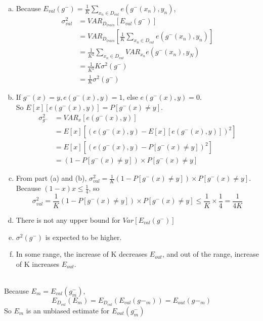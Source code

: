 \documentclass[11pt]{article}
\begin{document}
\newpage

\begin{enumerate} [(a)]
	\item Because $E_{val}(g^{-})=\frac{1}{K}\sum_{x_n\in D_{val}}e(g^{-}(x_n),y_n)$,
	\[
	\begin{aligned}
		\sigma^2_{val} &= VAR_{D_{train}}[E_{val}(g^{-})]\\
		&= VAR_{D_{train}}[\frac{1}{K}\sum_{x_n\in D_{val}}e(g^{-}(x_n),y_n)]\\
		&= \frac{1}{K^2}\sum_{x_n \in D_{val}}VAR_{x_n}e(g^{-}(x_n),y_N)\\
		&= \frac{1}{K^2}K\sigma^2(g^{-})\\
		&= \frac{1}{K}\sigma^2(g^{-})
	\end{aligned}
	\]

	\item If $g^{-}(x) = y, e(g^{-}(x),y)=1$, else $e(g^{-}(x),y) = 0$.\\
	So $E[x][e(g^{-}(x),y)] = P[g^{-}(x)\neq y]$.\\
	\[
	\begin{aligned}
		\sigma^2_{g^{-}} &= VAR_x[e(g^{-}(x),y)]\\
		&= E[x][(e(g^{-}(x),y)-E[x][e(g^{-}(x),y)])^2]\\
		&= E[x][(e(g^{-}(x),y)-P[g^{-}(x)\neq y])^2]\\
		&= (1-P[g^{-}(x)\neq y])\times P[g^{-}(x)\neq y]
	\end{aligned}
	\]

	\item From part (a) and (b), $\sigma^2_{val}=\frac{1}{K}(1-P[g^{-}(x)\neq y])\times P[g^{-}(x)\neq y]$.\\
	Because $(1-x)x\leq\frac{1}{4}$, so \[
	\sigma^2_{val}=\frac{1}{K}(1-P[g^{-}(x)\neq y])\times P[g^{-}(x)\neq y]\leq \frac{1}{K}\times \frac{1}{4}=\frac{1}{4K}
	\]

	\item There is not any upper bound for $Var[E_{val}(g^{-})]$

	\item $\sigma^2(g^{-})$ is expected to be higher.

	\item In some range, the increase of K decreases $E_{out}$, and out of the range, increase of K increases $E_{out}$.

\end{enumerate}

\newpage

\ \\
Because $E_m = E_{val}(g^{-}_m)$, \[
	E_{D_{val}}(E_m)=E_{D_{val}}(E_{val}(g{-}_m))=E_{out}(g{-}_m)
\]
So $E_m$ is an unbiased estimate for $E_{out}(g^{-}_m)$
\end{document}
